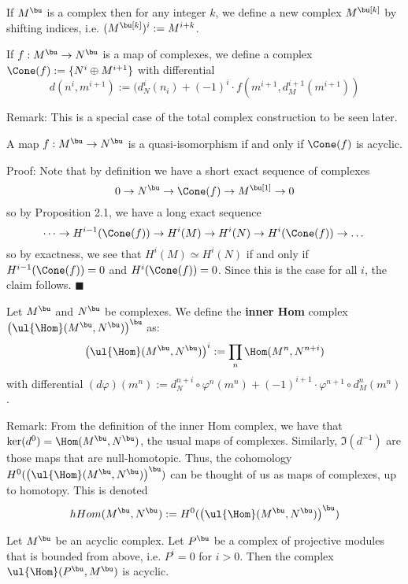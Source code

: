 \documentclass[10 pt]{article}
\newtheorem{cor}{Corollary}[section]
\newtheorem{lem}{Lemma}[section]
\newtheorem{prop}{Proposition}[section]
\newtheorem{propconstr}{Proposition-Construction}[section]
\newcommand\begin{lemma}{\begin{lem}}
\newcommand\begin{proposition}{\begin{prop}}
\newcommand\begin{proof}{\begin{proof}}
\newcommand\begin{corollary}{\begin{cor}}
\newcommand\begin{proposition}constr{\begin{propconstr}}
\newcommand\end{definition}{\end{defn}}
\newcommand\end{lemma}{\end{lem}}
\newcommand\end{corollary}{\end{cor}}
\newcommand\end{proposition}{\end{prop}}
\newcommand\end{proof}{\end{proof}}
\newcommand\end{proposition}constr{\end{propconstr}}
\begin{document}
\begin{definition} If $M^\bu$ is a complex then for any integer $k$, we define a new complex $M^\bu[k]$ by shifting indices, i.e. $(M^\bu[k])^i:=M^{i+k}$.\end{definition}

\begin{definition} If $f:M^\bu\rightarrow N^\bu$ is a map of complexes, we define a complex $\Cone(f):=\{N^i\oplus M^{i+1}\}$ with differential
$$d(n^i,m^{i+1}):= (d_N^i(n_i)+(-1)^i\cdot f(m^{i+1}, d_M^{i+1}(m^{i+1}))$$
\end{definition}

Remark:  This is a special case of the total complex construction to be seen later.

\begin{proposition} A map $f:M^\bu\rightarrow N^\bu$ is a quasi-isomorphism if and only if $\Cone(f)$ is acyclic.\end{proposition}

Proof:  Note that by definition we have a short exact sequence of complexes
$$0\rightarrow N^\bu\rightarrow \Cone(f)\rightarrow M^\bu[1]\rightarrow 0$$
so by Proposition 2.1, we have a long exact sequence
$$\dots \rightarrow H^{i-1}(\Cone(f))\rightarrow H^{i}(M)\rightarrow H^{i}(N)\rightarrow H^{i}(\Cone(f))\rightarrow\dots$$
so by exactness, we see that $H^i(M)\simeq H^i(N)$ if and only if $H^{i-1}(\Cone(f))=0$ and $H^i(\Cone(f))=0$.  Since this is the case for all $i$, the claim follows. $\blacksquare$

\begin{definition} Let $M^\bu$ and $N^\bu$ be complexes. We define the {\bf inner Hom} complex $\left(\ul{\Hom}(M^\bu,N^\bu)\right)^\bu$ as:
$$\left(\ul{\Hom}(M^\bu,N^\bu)\right)^i:= \prod_n \Hom(M^n,N^{n+i})$$
with differential $(d\varphi)(m^n):=d_N^{n+i}\circ\varphi^n(m^n)+ (-1)^{i+1}\cdot \varphi^{n+1}\circ d_M^n(m^n)$.
\end{definition}

Remark:  From the definition of the inner Hom complex, we have that $\ker(d^0)=\Hom(M^\bu,N^\bu)$, the usual maps of complexes.  Similarly, $\Im(d^{-1})$ are those maps that are null-homotopic.  Thus, the cohomology $H^0(\left(\ul{\Hom}(M^\bu,N^\bu)\right)^\bu)$ can be thought of us as maps of complexes, up to homotopy.  This is denoted
$$hHom(M^\bu,N^\bu):=H^0(\left(\ul{\Hom}(M^\bu,N^\bu)\right)^\bu)$$

\begin{lemma} Let $M^\bu$ be an acyclic complex.  Let $P^\bu$ be a complex of projective modules that is bounded from above, i.e. $P^i=0$ for $i>0$.  Then the complex $\ul{\Hom}(P^\bu,M^\bu)$ is acyclic.  \end{lemma}
\end{document}
